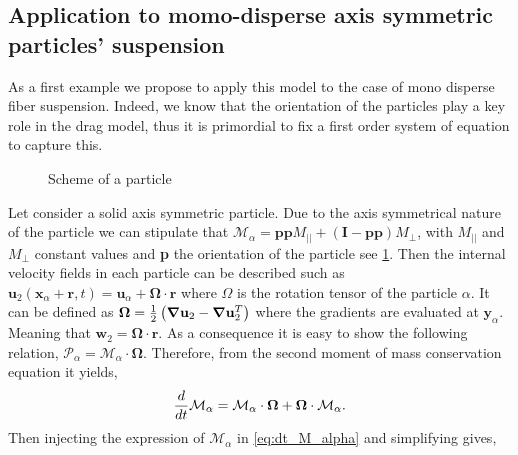 \subsection{Application to momo-disperse axis symmetric particles' suspension}

As a first example we propose to apply this model to the case of mono disperse fiber suspension.
Indeed, we know that the orientation of the particles play a key role in the drag model, thus it is primordial to fix a first order system of equation to capture this.  
\begin{figure}[h!]
    \centering
    \caption{Scheme of a particle}
    \label{fig:scheme2}
\end{figure}
Let consider a solid axis symmetric particle. 
Due to the axis symmetrical nature of the particle we can stipulate that 
$\mathcal{M}_\alpha =  \textbf{pp}M_{||} +  (\textbf{I} - \textbf{pp})M_\bot$, with $M_{||}$ and $M_\bot$ constant values and \textbf{p} the orientation of the particle see \ref{fig:scheme2}.
Then the internal velocity fields in each particle can be described such as $\textbf{u}_2(\textbf{x}_\alpha + \textbf{r},t) = \textbf{u}_\alpha + \mathbf{\Omega}\cdot \textbf{r}$ where $\Omega$ is the rotation tensor of the particle $\alpha$.
It can be defined as $\mathbf{\Omega}  = \frac{1}{2}\left(\bm{\nabla}\textbf{u}_2 - \bm{\nabla}\textbf{u}_2^T\right)$ where the gradients are evaluated at $\textbf{y}_\alpha$. 
Meaning that $\textbf{w}_2 = \mathbf{\Omega}\cdot \textbf{r}$.
As a consequence it is easy to show the following relation, $\mathcal{P}_\alpha = \mathcal{M}_\alpha \cdot \mathbf{\Omega}$.
Therefore, from the second moment of mass conservation equation it yields,
\begin{equation}
    \frac{d}{d t} \mathcal{M}_\alpha 
    = \mathcal{M}_\alpha \cdot \mathbf{\Omega} + \mathbf{\Omega} \cdot \mathcal{M}_\alpha.
    \label{eq:dt_M_alpha}
\end{equation}
Then injecting the expression of $\mathcal{M}_\alpha$ in \ref{eq:dt_M_alpha} and  simplifying gives, 
